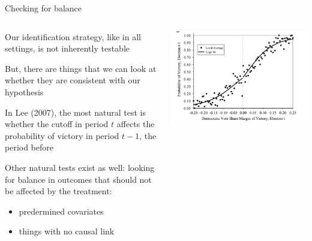 \documentclass[notes,11pt, aspectratio=169]{beamer}
\newenvironment{wideitemize}{\itemize\addtolength{\itemsep}{10pt}}{\enditemize}
\begin{document}
\begin{frame}{Checking for balance}
  \begin{columns}[onlytextwidth, T] %
    \begin{column}{.5\textwidth}
      \begin{wideitemize}
      \item Our identification strategy, like in all settings, is
        not inherently testable
      \item But, there are things that we can look at whether they
        are consistent with our hypothesis
      \item In Lee (2007), the most natural test is whether the
        cutoff in period $t$ affects the probability of victory in
        period $t-1$, the period before
      \item Other natural tests exist as well: looking for balance
        in outcomes that should not be affected by the treatment:
        \begin{itemize}
        \item predermined covariates
        \item things with no causal link 
        \end{itemize}
      \end{wideitemize}
    \end{column}%
    \hfill%
    \begin{column}{.5\textwidth}
      \includegraphics[width=\linewidth]{images/lee3b.png}
    \end{column}%
  \end{columns}
\end{frame}
\end{document}
